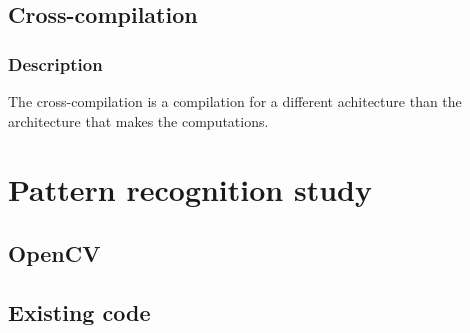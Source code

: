 \documentclass[english,a4paper,11pt]{report}
\begin{document}
	\subsection{Cross-compilation}
	\subsubsection{Description}
	\par The cross-compilation is a compilation for a different achitecture than the architecture that makes the computations.
	\section{Pattern recognition study}
	\subsection{OpenCV}
	\subsection{Existing code}

	
	

	\clearpage

{}
	


	\listoffigures
	
	

	
	
\end{document}
